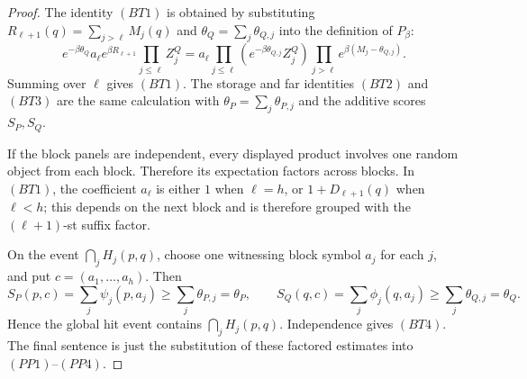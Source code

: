 \documentclass[10pt]{article}
\theoremstyle{definition}
\begin{document}
\begin{proof}
   The identity \((BT1)\) is obtained by substituting
   \(R_{\ell+1}(q)=\sum_{j>\ell}M_j(q)\) and
   \(\theta_Q=\sum_j\theta_{Q,j}\) into the definition of \(P_\beta\):
   \[
      e^{-\beta\theta_Q}
      a_\ell e^{\beta R_{\ell+1}}\prod_{j\le\ell}Z_j^Q
      =
      a_\ell
      \prod_{j\le\ell}
      \left(e^{-\beta\theta_{Q,j}}Z_j^Q\right)
      \prod_{j>\ell}
      e^{\beta(M_j-\theta_{Q,j})}.
   \]
   Summing over \(\ell\) gives \((BT1)\).  The storage and far identities
   \((BT2)\) and \((BT3)\) are the same calculation with
   \(\theta_P=\sum_j\theta_{P,j}\) and the additive scores
   \(S_P,S_Q\).

   If the block panels are independent, every displayed product involves one
   random object from each block.  Therefore its expectation factors across
   blocks.  In \((BT1)\), the coefficient \(a_\ell\) is either \(1\) when
   \(\ell=h\), or \(1+D_{\ell+1}(q)\) when \(\ell<h\); this depends on the
   next block and is therefore grouped with the \((\ell+1)\)-st suffix factor.

   On the event \(\bigcap_jH_j(p,q)\), choose one witnessing block symbol
   \(a_j\) for each \(j\), and put \(c=(a_1,\ldots,a_h)\).  Then
   \[
      S_P(p,c)=\sum_j\psi_j(p,a_j)\ge\sum_j\theta_{P,j}=\theta_P,
      \qquad
      S_Q(q,c)=\sum_j\phi_j(q,a_j)\ge\sum_j\theta_{Q,j}=\theta_Q .
   \]
   Hence the global hit event contains \(\bigcap_jH_j(p,q)\).  Independence
   gives \((BT4)\).  The final sentence is just the substitution of these
   factored estimates into \((PP1)\)--\((PP4)\).
\end{proof}
\end{document}
